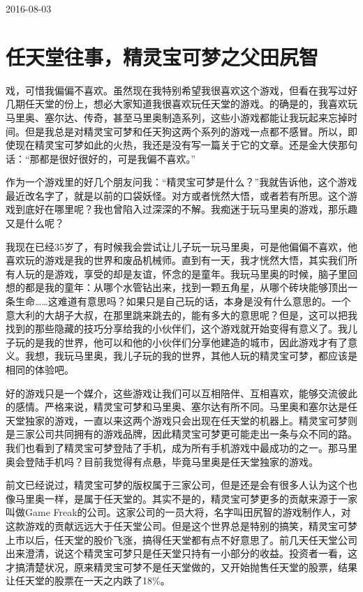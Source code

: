 \documentclass[
  letterpaper,
  DIV=11,
  numbers=noendperiod]{scrreprt}
\begin{document}
2016-08-03


\chapter{任天堂往事，精灵宝可梦之父田尻智}\label{ux4efbux5929ux5802ux5f80ux4e8bux7cbeux7075ux5b9dux53efux68a6ux4e4bux7236ux7530ux5c3bux667a}

戏，可惜我偏偏不喜欢。虽然现在我特别希望我很喜欢这个游戏，但看在我写过好几期任天堂的份上，想必大家知道我很喜欢玩任天堂的游戏。的确是的，我喜欢玩马里奥、塞尔达、传奇，甚至马里奥制造系列，这些小游戏都能让我玩起来忘掉时间。但是我总是对精灵宝可梦和任天狗这两个系列的游戏一点都不感冒。所以，即使现在精灵宝可梦如此的火热，我还是没有写一篇关于它的文章。还是金大侠那句话：``那都是很好很好的，可是我偏不喜欢。''

作为一个游戏里的好几个朋友问我：``精灵宝可梦是什么？''我就告诉他，这个游戏最近改名字了，就是以前的口袋妖怪。对方或者恍然大悟，或者若有所思。这个游戏到底好在哪里呢？我也曾陷入过深深的不解。我痴迷于玩马里奥的游戏，那乐趣又是什么呢？

我现在已经35岁了，有时候我会尝试让儿子玩一玩马里奥，可是他偏偏不喜欢，他喜欢玩的游戏是我的世界和废品机械师。直到有一天，我才恍然大悟，其实我们所有人玩的是游戏，享受的却是友谊，怀念的是童年。我玩马里奥的时候，脑子里回想的都是我的童年：从哪个水管钻出来，找到一颗五角星，从哪个砖块能够顶出一条生命\ldots\ldots 这难道有意思吗？如果只是自己玩的话，本身是没有什么意思的。一个意大利的大胡子大叔，在那里跳来跳去的，能有多大的意思呢？但是，这可以把我找到的那些隐藏的技巧分享给我的小伙伴们，这个游戏就开始变得有意义了。我儿子玩的是我的世界，他可以和他的小伙伴们分享他建造的城市，因此游戏才有了意义。我想，我玩马里奥，我儿子玩的我的世界，其他人玩的精灵宝可梦，都应该是相同的体验吧。

好的游戏只是一个媒介，这些游戏让我们可以互相陪伴、互相喜欢，能够交流彼此的感情。严格来说，精灵宝可梦和马里奥、塞尔达有所不同。马里奥和塞尔达是任天堂独家的游戏，一直以来这两个游戏只会出现在任天堂的机器上。精灵宝可梦则是三家公司共同拥有的游戏品牌，因此精灵宝可梦更可能走出一条与众不同的路。我们也看到了精灵宝可梦登陆了手机，成为所有手机游戏中最成功的之一。那马里奥会登陆手机吗？目前我觉得有点悬，毕竟马里奥是任天堂独家的游戏。

前文已经说过，精灵宝可梦的版权属于三家公司，但是还是会有很多人认为这个也像马里奥一样，是属于任天堂的。其实不是的，精灵宝可梦更多的贡献来源于一家叫做Game
Freak的公司。这家公司的一员大将，名字叫田尻智的游戏制作人，对这款游戏的贡献远远大于任天堂公司。但是这个世界总是特别的搞笑，精灵宝可梦上市以后，任天堂的股价飞涨，搞得任天堂都有点不好意思了。前几天任天堂公司出来澄清，说这个精灵宝可梦只是任天堂只持有一小部分的收益。投资者一看，这才搞清楚状况，原来精灵宝可梦不是任天堂做的，又开始抛售任天堂的股票，结果让任天堂的股票在一天之内跌了18\%。
\end{document}
